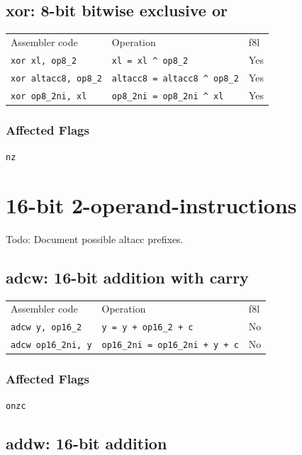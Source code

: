 \documentclass{book}
\begin{document}
\subsection{xor: 8-bit bitwise exclusive or}

\begin{tabular}{l l l}
Assembler code               & Operation                              & f8l \\
\texttt{xor xl, op8\_2}      & \texttt{xl = xl \^{} op8\_2}           & Yes \\
\texttt{xor altacc8, op8\_2} & \texttt{altacc8 = altacc8 \^{} op8\_2} & Yes \\
\texttt{xor op8\_2ni, xl}    & \texttt{op8\_2ni = op8\_2ni \^{} xl}   & Yes
\end{tabular}

\subsubsection*{Affected Flags}

\texttt{nz}


\section{16-bit 2-operand-instructions}

Todo: Document possible altacc prefixes.

\subsection{adcw: 16-bit addition with carry}

\begin{tabular}{l l l}
Assembler code              & Operation                              & f8l \\
\texttt{adcw y, op16\_2}    & \texttt{y = y + op16\_2 + c}           & No \\
\texttt{adcw op16\_2ni, y} & \texttt{op16\_2ni = op16\_2ni + y + c} & No
\end{tabular}

\subsubsection*{Affected Flags}

\texttt{onzc}


\subsection{addw: 16-bit addition}
\end{document}
